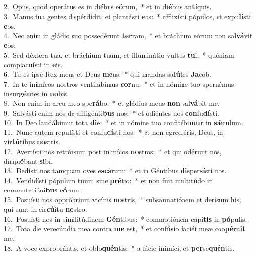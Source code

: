 {2.~}Opus, quod operátus es in diébus e\textbf{ó}rum,~* et in di\textbf{é}bus an\textbf{tí}quis.\\
{3.~}Manus tua gentes dispérdidit, et plantásti \textbf{e}os:~* afflixísti pópulos, et expu\textbf{lí}sti \textbf{e}os.\\
{4.~}Nec enim in gládio suo possedérunt \textbf{ter}ram,~* et bráchium eórum non sal\textbf{vá}vit \textbf{e}os:\\
{5.~}Sed déxtera tua, et bráchium tuum, et illuminátio vultus \textbf{tu}i,~* quóniam complacu\textbf{í}sti in \textbf{e}is.\\
{6.~}Tu es ipse Rex meus et Deus \textbf{me}us:~* qui mandas sa\textbf{lú}tes \textbf{Ja}cob.\\
{7.~}In te inimícos nostros ventilábimus \textbf{cor}nu:~* et in nómine tuo spernémus insur\textbf{gén}tes in \textbf{no}bis.\\
{8.~}Non enim in arcu meo spe\textbf{rá}bo:~* et gládius meus \textbf{non} sal\textbf{vá}bit me.\\
{9.~}Salvásti enim nos de affligénti\textbf{bus} nos:~* et odiéntes nos \textbf{con}fu\textbf{dí}sti.\\
{10.~}In Deo laudábimur tota \textbf{di}e:~* et in nómine tuo confitébi\textbf{mur} in \textbf{sǽ}culum.\\
{11.~}Nunc autem repulísti et confu\textbf{dí}sti nos:~* et non egrediéris, Deus, in vir\textbf{tú}tibus \textbf{no}stris.\\
{12.~}Avertísti nos retrórsum post inimícos \textbf{no}stros:~* et qui odérunt nos, diripi\textbf{é}bant \textbf{si}bi.\\
{13.~}Dedísti nos tamquam oves e\textbf{scá}rum:~* et in Géntibus \textbf{di}sper\textbf{sí}sti nos.\\
{14.~}Vendidísti pópulum tuum sine \textbf{pré}tio:~* et non fuit multitúdo in commutatióni\textbf{bus} e\textbf{ó}rum.\\
{15.~}Posuísti nos oppróbrium vicínis \textbf{no}stris,~* subsannatiónem et derísum his, qui sunt in cir\textbf{cú}itu \textbf{no}stro.\\
{16.~}Posuísti nos in similitúdinem \textbf{Gén}tibus:~* commotiónem cápi\textbf{tis} in \textbf{pó}pulis.\\
{17.~}Tota die verecúndia mea contra \textbf{me} est,~* et confúsio faciéi meæ coo\textbf{pé}ru\textbf{it} me.\\
{18.~}A voce exprobrántis, et oblo\textbf{quén}tis:~* a fácie inimíci, et \textbf{per}se\textbf{quén}tis.\\
